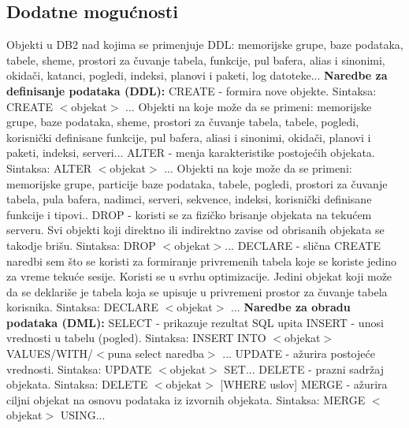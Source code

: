 \documentclass{article}
\begin{document}
\subsection{Dodatne mogućnosti}
Objekti u DB2 nad kojima se primenjuje DDL: memorijske grupe, baze 
podataka, tabele, sheme, prostori za čuvanje tabela, funkcije, pul 
bafera, alias i sinonimi, okidači, katanci, pogledi, indeksi, 
planovi i paketi, log datoteke... 
\vspace{0.2cm} \newline
\textbf{Naredbe za definisanje podataka (DDL):}
\newline CREATE - formira nove objekte. Sintaksa: CREATE 
$<$objekat$>$ ... Objekti na koje može da se primeni: memorijske 
grupe, baze podataka, sheme, prostori za čuvanje tabela, tabele, 
pogledi, korisnički definisane funkcije, pul bafera, aliasi i 
sinonimi, okidači, planovi i paketi, indeksi, serveri...
\newline ALTER - menja karakteristike postojećih objekata. 
Sintaksa: ALTER $<$objekat$>$ ... Objekti na koje može da se 
primeni: memorijske grupe, particije baze podataka, tabele, 
pogledi, prostori za čuvanje tabela, pula bafera, nadimci, serveri,
sekvence, indeksi, korisnički definisane funkcije i tipovi..
\newline DROP - koristi se za fizičko brisanje objekata na tekućem 
serveru. Svi objekti koji direktno ili indirektno zavise od 
obrisanih objekata se takodje brišu. Sintaksa: DROP 
$<$objekat$>$...
\newline DECLARE - slična CREATE naredbi sem što se koristi za 
formiranje privremenih tabela koje se koriste jedino za vreme 
tekuće sesije. Koristi se u svrhu optimizacije. Jedini objekat koji
može da se deklariše je tabela 
koja se upisuje u privremeni prostor za čuvanje tabela korisnika. 
Sintaksa: DECLARE $<$objekat$>$ ...
\vspace{0.2cm} \newline
\textbf{Naredbe za obradu podataka (DML):}
\newline SELECT - prikazuje rezultat SQL upita
\newline INSERT - unosi vrednosti u tabelu (pogled). Sintaksa: 
\newline \hspace*{1,2cm} INSERT INTO $<$objekat$>$ 
VALUES/WITH/$<$puna select naredba$>$ ...
\newline UPDATE - ažurira postojeće vrednosti. Sintaksa: UPDATE 
$<$objekat$>$ SET...
\newline DELETE - prazni sadržaj objekata. Sintaksa: DELETE 
$<$objekat$>$ [WHERE uslov]
\newline MERGE - ažurira ciljni objekat na osnovu podataka iz 
izvornih objekata. Sintaksa: MERGE $<$objekat$>$ USING...
\end{document}
